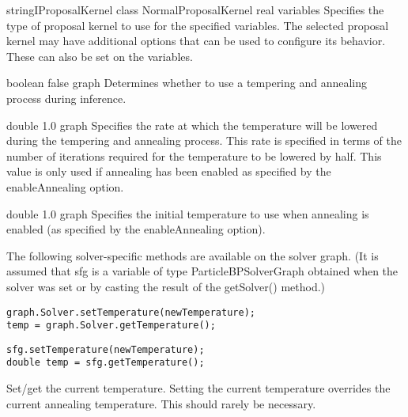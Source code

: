 
{\ifmatlab string\fi \ifjava IProposalKernel class\fi}
{NormalProposalKernel}
{real variables}
{Specifies the type of proposal kernel to use for the specified variables. The selected proposal kernel may have additional options that can be used to configure its behavior. These can also be set on the variables.}


{boolean}
{false}
{graph}
{Determines whether to use a tempering and annealing process during inference.}


{double}
{1.0}
{graph}
{Specifies the rate at which the temperature will be lowered during the tempering and annealing process. This rate is specified in terms of the number of iterations required for the temperature to be lowered by half. This value is only used if annealing has been enabled as specified by the enableAnnealing option.}


{double}
{1.0}
{graph}
{Specifies the initial temperature to use when annealing is enabled (as specified by the enableAnnealing option).}


The following solver-specific methods are available on the solver graph. \ifjava (It is assumed that sfg is a variable of type ParticleBPSolverGraph obtained when the solver was set or by casting the result of the getSolver() method.)\fi

\ifmatlab
\begin{lstlisting}
graph.Solver.setTemperature(newTemperature);
temp = graph.Solver.getTemperature();
\end{lstlisting}
\fi

\ifjava
\begin{lstlisting}
sfg.setTemperature(newTemperature);
double temp = sfg.getTemperature();
\end{lstlisting}
\fi

Set/get the current temperature. Setting the current temperature overrides the current annealing temperature. This should rarely be necessary.

